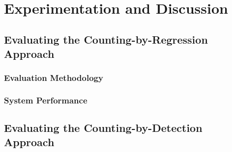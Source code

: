 




\def\baselinestretch{1}

\chapter{Experimentation and Discussion}



\smallskip

\goodbreak

\section{Evaluating the Counting-by-Regression Approach}
\subsection{Evaluation Methodology}

\subsection{System Performance}

\section{Evaluating the Counting-by-Detection Approach}
